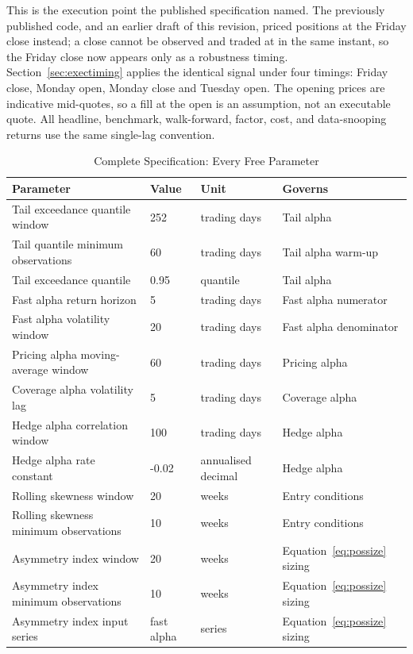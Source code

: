 \documentclass[11pt]{article}
\begin{document}
This is the execution point the published specification named. The previously published code, and an earlier draft of this revision, priced positions at the Friday close instead; a close cannot be observed and traded at in the same instant, so the Friday close now appears only as a robustness timing. Section~\ref{sec:exectiming} applies the identical signal under four timings: Friday close, Monday open, Monday close and Tuesday open. The opening prices are indicative mid-quotes, so a fill at the open is an assumption, not an executable quote. All headline, benchmark, walk-forward, factor, cost, and data-snooping returns use the same single-lag convention.

\begin{table}[H]
\centering
\caption{Complete Specification: Every Free Parameter}
\label{tab:spec}
\scriptsize
\begin{tabular}{@{}llll@{}}
\toprule
Parameter & Value & Unit & Governs \\
\midrule
Tail exceedance quantile window & 252 & trading days & Tail alpha \\
Tail quantile minimum observations & 60 & trading days & Tail alpha warm-up \\
Tail exceedance quantile & 0.95 & quantile & Tail alpha \\
Fast alpha return horizon & 5 & trading days & Fast alpha numerator \\
Fast alpha volatility window & 20 & trading days & Fast alpha denominator \\
Pricing alpha moving-average window & 60 & trading days & Pricing alpha \\
Coverage alpha volatility lag & 5 & trading days & Coverage alpha \\
Hedge alpha correlation window & 100 & trading days & Hedge alpha \\
Hedge alpha rate constant & -0.02 & annualised decimal & Hedge alpha \\
Rolling skewness window & 20 & weeks & Entry conditions \\
Rolling skewness minimum observations & 10 & weeks & Entry conditions \\
Asymmetry index window & 20 & weeks & Equation~\ref{eq:possize} sizing \\
Asymmetry index minimum observations & 10 & weeks & Equation~\ref{eq:possize} sizing \\
Asymmetry index input series & fast alpha & series & Equation~\ref{eq:possize} sizing \\

\end{tabular}
\end{table}
\end{document}
